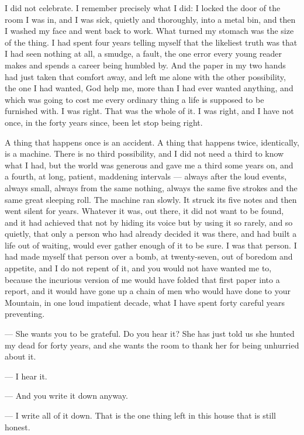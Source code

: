 I did not celebrate. I remember precisely what I did: I locked the door of the room I was in, and I was sick, quietly and thoroughly, into a metal bin, and then I washed my face and went back to work. What turned my stomach was the size of the thing. I had spent four years telling myself that the likeliest truth was that I had seen nothing at all, a smudge, a fault, the one error every young reader makes and spends a career being humbled by. And the paper in my two hands had just taken that comfort away, and left me alone with the other possibility, the one I had wanted, God help me, more than I had ever wanted anything, and which was going to cost me every ordinary thing a life is supposed to be furnished with. I was right. That was the whole of it. I was right, and I have not once, in the forty years since, been let stop being right.\par

A thing that happens once is an accident. A thing that happens twice, identically, is a machine. There is no third possibility, and I did not need a third to know what I had, but the world was generous and gave me a third some years on, and a fourth, at long, patient, maddening intervals --- always after the loud events, always small, always from the same nothing, always the same five strokes and the same great sleeping roll. The machine ran slowly. It struck its five notes and then went silent for years. Whatever it was, out there, it did not want to be found, and it had achieved that not by hiding its voice but by using it so rarely, and so quietly, that only a person who had already decided it was there, and had built a life out of waiting, would ever gather enough of it to be sure. I was that person. I had made myself that person over a bomb, at twenty-seven, out of boredom and appetite, and I do not repent of it, and you would not have wanted me to, because the incurious version of me would have folded that first paper into a report, and it would have gone up a chain of men who would have done to your Mountain, in one loud impatient decade, what I have spent forty careful years preventing.\par

\begin{room}

--- She wants you to be grateful. Do you hear it? She has just told us she hunted my dead for forty years, and she wants the room to thank her for being unhurried about it.

--- I hear it.

--- And you write it down anyway.

--- I write all of it down. That is the one thing left in this house that is still honest.

\end{room}

